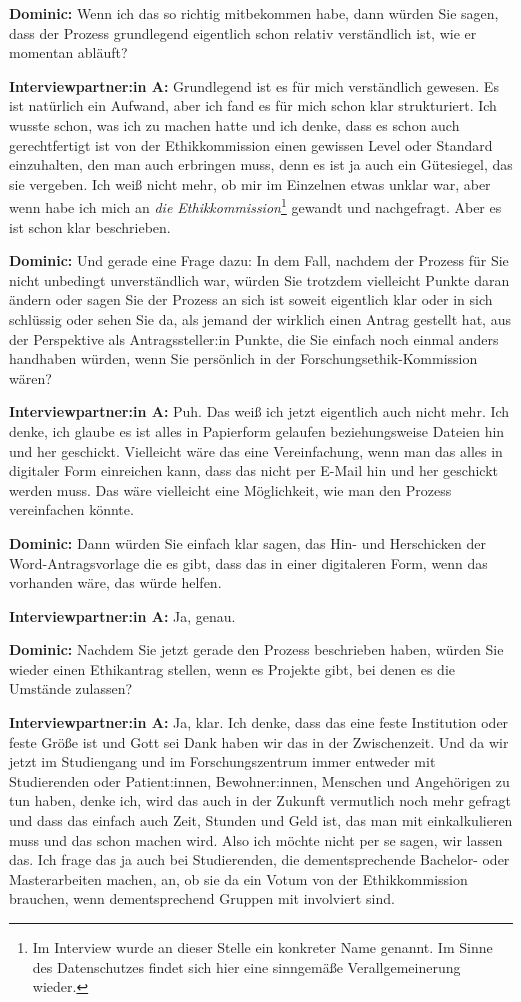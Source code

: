 \documentclass[a4paper,12pt,twoside]{scrreprt}
\begin{document}
\textbf{Dominic:} Wenn ich das so richtig mitbekommen habe, dann würden Sie sagen, dass der Prozess grundlegend eigentlich schon relativ verständlich ist, wie er momentan abläuft?

\textbf{Interviewpartner:in A:} Grundlegend ist es für mich verständlich gewesen. Es ist natürlich ein Aufwand, aber ich fand es für mich schon klar strukturiert. Ich wusste schon, was ich zu machen hatte und ich denke, dass es schon auch gerechtfertigt ist von der Ethikkommission einen gewissen Level oder Standard einzuhalten, den man auch erbringen muss, denn es ist ja auch ein Gütesiegel, das sie vergeben. Ich weiß nicht mehr, ob mir im Einzelnen etwas unklar war, aber wenn habe ich mich an \textit{die Ethikkommission}\footnote{Im Interview wurde an dieser Stelle ein konkreter Name genannt. Im Sinne des Datenschutzes findet sich hier eine sinngemäße Verallgemeinerung wieder.} gewandt und nachgefragt. Aber es ist schon klar beschrieben.

\textbf{Dominic:} Und gerade eine Frage dazu: In dem Fall, nachdem der Prozess für Sie nicht unbedingt unverständlich war, würden Sie trotzdem vielleicht Punkte daran ändern oder sagen Sie der Prozess an sich ist soweit eigentlich klar oder in sich schlüssig oder sehen Sie da, als jemand der wirklich einen Antrag gestellt hat, aus der Perspektive als Antragssteller:in Punkte, die Sie einfach noch einmal anders handhaben würden, wenn Sie persönlich in der Forschungsethik-Kommission wären?

\textbf{Interviewpartner:in A:} Puh. Das weiß ich jetzt eigentlich auch nicht mehr. Ich denke, ich glaube es ist alles in Papierform gelaufen beziehungsweise Dateien hin und her geschickt. Vielleicht wäre das eine Vereinfachung, wenn man das alles in digitaler Form einreichen kann, dass das nicht per E-Mail hin und her geschickt werden muss. Das wäre vielleicht eine Möglichkeit, wie man den Prozess vereinfachen könnte.

\textbf{Dominic:} Dann würden Sie einfach klar sagen, das Hin- und Herschicken der Word-Antragsvorlage die es gibt, dass das in einer digitaleren Form, wenn das vorhanden wäre, das würde helfen.

\textbf{Interviewpartner:in A:} Ja, genau.

\textbf{Dominic:} Nachdem Sie jetzt gerade den Prozess beschrieben haben, würden Sie wieder einen Ethikantrag stellen, wenn es Projekte gibt, bei denen es die Umstände zulassen?

\textbf{Interviewpartner:in A:} Ja, klar. Ich denke, dass das eine feste Institution oder feste Größe ist und Gott sei Dank haben wir das in der Zwischenzeit. Und da wir jetzt im Studiengang und im Forschungszentrum immer entweder mit Studierenden oder Patient:innen, Bewohner:innen, Menschen und Angehörigen zu tun haben, denke ich, wird das auch in der Zukunft vermutlich noch mehr gefragt und dass das einfach auch Zeit, Stunden und Geld ist, das man mit einkalkulieren muss und das schon machen wird. Also ich möchte nicht per se sagen, wir lassen das. Ich frage das ja auch bei Studierenden, die dementsprechende Bachelor- oder Masterarbeiten machen, an, ob sie da ein Votum von der Ethikkommission brauchen, wenn dementsprechend Gruppen mit involviert sind.
\end{document}
